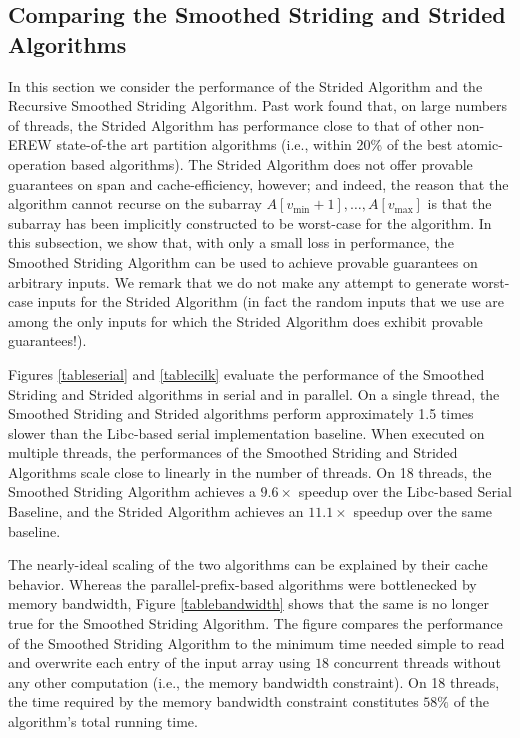\documentclass[sigplan, 10pt, nonacm]{acmart}
\theoremstyle{remark}
\theoremstyle{remark}
\begin{document}
\subsection{Comparing the Smoothed Striding and Strided Algorithms} \label{subsecstrided}

In this section we consider the performance of the Strided Algorithm
and the Recursive Smoothed Striding Algorithm. Past work
\cite{Frias08} found that, on large numbers of threads, the Strided
Algorithm has performance close to that of other non-EREW state-of-the
art partition algorithms (i.e., within 20\% of the best
atomic-operation based algorithms). The Strided Algorithm does not
offer provable guarantees on span and cache-efficiency, however; and
indeed, the reason that the algorithm cannot recurse on the subarray
$A[v_{\text{min}} + 1], \ldots, A[v_{\text{max}}]$ is that the subarray has been
implicitly constructed to be worst-case for the algorithm. In this
subsection, we show that, with only a small loss in performance, the
Smoothed Striding Algorithm can be used to achieve provable guarantees
on arbitrary inputs. We remark that we do not make any attempt to
generate worst-case inputs for the Strided Algorithm (in fact the
random inputs that we use are among the only inputs for which the
Strided Algorithm does exhibit provable guarantees!).

Figures \ref{tableserial} and \ref{tablecilk} evaluate the performance
of the Smoothed Striding and Strided algorithms in serial and in
parallel. On a single thread, the Smoothed Striding and Strided
algorithms perform approximately 1.5 times slower than the Libc-based
serial implementation baseline. When executed on multiple threads, the
performances of the Smoothed Striding and Strided Algorithms scale
close to linearly in the number of threads. On 18 threads, the
Smoothed Striding Algorithm achieves a $9.6 \times $ speedup over the
Libc-based Serial Baseline, and the Strided Algorithm achieves an
$11.1 \times$ speedup over the same baseline.

The nearly-ideal scaling of the two algorithms can be explained by
their cache behavior. Whereas the parallel-prefix-based algorithms
were bottlenecked by memory bandwidth, Figure \ref{tablebandwidth}
shows that the same is no longer true for the Smoothed Striding
Algorithm. The figure compares the performance of the Smoothed
Striding Algorithm to the minimum time needed simple to read and overwrite
each entry of the input array using $18$ concurrent threads without any other
computation (i.e., the memory bandwidth constraint). On 18 threads, the time required by the memory bandwidth
constraint constitutes $58\%$ of the algorithm's total running time.
\end{document}
